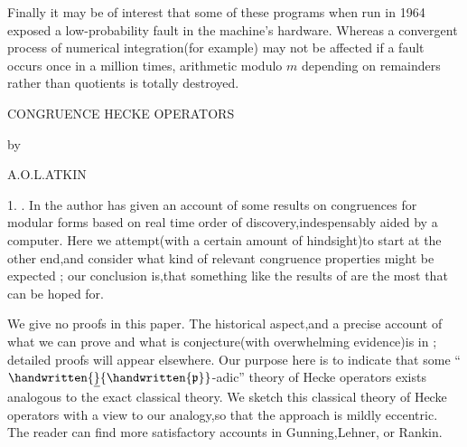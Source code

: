 Finally it may be of interest that some of these programs when run in 1964 exposed a low-probability  fault in the machine's hardware. Whereas a convergent process of numerical integration(for example) may not be affected if a fault occurs once in a million times, arithmetic modulo \uline{$m$} depending on remainders rather than quotients is totally destroyed.
\normalmarginpar
\begin{center}
CONGRUENCE HECKE OPERATORS

by

A.O.L.ATKIN
\end{center}

1. . \quad In  the author has given an account of some results on congruences for modular forms based on real time order of discovery,indespensably aided by a computer. Here we attempt(with a certain amount of hindsight)to start at the other end,and consider what kind of relevant congruence properties might be expected   ; our conclusion is,that something like the results of  are the most that can be hoped for.

We give no proofs in this paper. The historical aspect,and a precise account of what we can prove and what is conjecture(with overwhelming evidence)is in ; detailed proofs will appear elsewhere. Our purpose here is to indicate that some \reversemarginpar{}\normalmarginpar``$\handwritten{\underline}{\handwritten{\mathfrak{p}}}$-adic'' theory of Hecke operators exists analogous to the exact classical theory. We sketch this classical theory of Hecke operators with a view to our analogy,so that the approach is mildly eccentric. The reader can find more satisfactory accounts in Gunning,Lehner, or Rankin.

